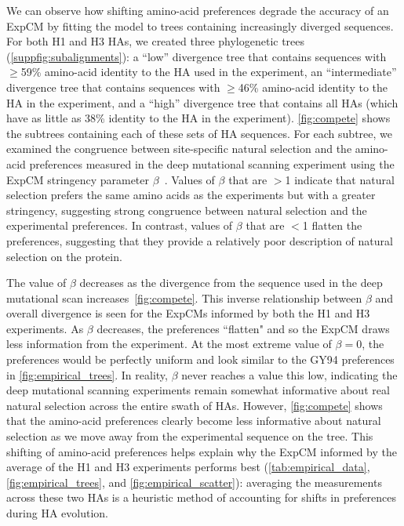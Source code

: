 \documentclass[11pt]{article}
\begin{document}
We can observe how shifting amino-acid preferences degrade the accuracy of an ExpCM by fitting the model to trees containing increasingly diverged sequences.
For both H1 and H3 HAs, we created three phylogenetic trees (\ref{suppfig:subalignments}): a ``low'' divergence tree that contains sequences with $\ge$59\% amino-acid identity to the HA used in the experiment, an ``intermediate'' divergence tree that contains sequences with $\ge$46\% amino-acid identity to the HA in the experiment, and a ``high'' divergence tree that contains all HAs (which have as little as 38\% identity to the HA in the experiment).
\ref{fig:compete} shows the subtrees containing each of these sets of HA sequences.
For each subtree, we examined the congruence between site-specific natural selection and the amino-acid preferences measured in the deep mutational scanning experiment using the ExpCM stringency parameter $\beta$~\citep{bloom2014informed,hilton2017phydms}. 
Values of $\beta$ that are $>$1 indicate that natural selection prefers the same amino acids as the experiments but with a greater stringency, suggesting strong congruence between natural selection and the experimental preferences. 
In contrast, values of $\beta$ that are $<$1 flatten the preferences, suggesting that they provide a relatively poor description of natural selection on the protein.

The value of $\beta$ decreases as the divergence from the sequence used in the deep mutational scan increases~\ref{fig:compete}. 
This inverse relationship between $\beta$ and overall divergence is seen for the ExpCMs informed by both the H1 and H3 experiments.
As $\beta$ decreases, the preferences ``flatten" and so the ExpCM draws less information from the experiment. 
At the most extreme value of $\beta = 0$, the preferences would be perfectly uniform and look similar to the GY94 preferences in \ref{fig:empirical_trees}.
In reality, $\beta$ never reaches a value this low, indicating the deep mutational scanning experiments remain somewhat informative about real natural selection across the entire swath of HAs. 
However, \ref{fig:compete} shows that the amino-acid preferences clearly become less informative about natural selection as we move away from the experimental sequence on the tree.
This shifting of amino-acid preferences helps explain why the ExpCM informed by the average of the H1 and H3 experiments performs best (\ref{tab:empirical_data}, \ref{fig:empirical_trees}, and \ref{fig:empirical_scatter}): averaging the measurements across these two HAs is a heuristic method of accounting for shifts in preferences during HA evolution. 
 
\end{document}
